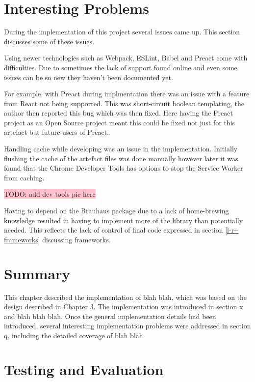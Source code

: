 \section{Interesting Problems} \label{s-i--interesting-problems}

During the implementation of this project several issues came up. This section discusses some of these issues.

Using newer technologies such as Webpack, ESLint, Babel and Preact come with difficulties. Due to sometimes the lack of support found online and even some issues can be so new they haven't been documented yet.

For example, with Preact during implmentation there was an issue with a feature from React not being supported. This was short-circuit boolean templating, the author then reported this bug which was then fixed. Here having the Preact project as an Open Source project meant this could be fixed not just for this artefact but future users of Preact.


Handling cache while developing was an issue in the implementation. Initially flushing the cache of the artefact files was done manually however later it was found that the Chrome Developer Tools has options to stop the Service Worker from caching.

\colorbox{pink}{TODO: add dev tools pic here}

Having to depend on the Brauhaus package due to a lack of home-brewing knowledge resulted in having to implement more of the library than potentially needed. This reflects the lack of control of final code expressed in section \ref{l-r--frameworks} discussing frameworks.

\section{Summary} \label{s-i--summary}

This chapter described the implementation of blah blah, which was based on the design described in Chapter 3. The implementation was introduced in section x and blah blah blah. Once the general implementation details had been introduced, several interesting implementation problems were addressed in section q, including the detailed coverage of blah blah.

\section{Testing and Evaluation} \label{s-i--testing-and-evaluation}

